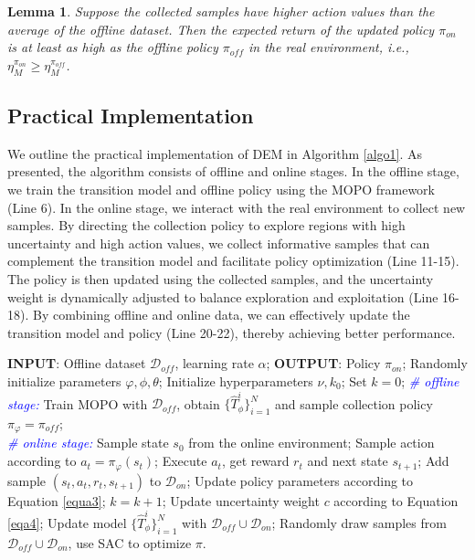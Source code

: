 \documentclass[conference]{IEEEtran}
\newtheorem{lemma}{Lemma}
\begin{document}
\begin{lemma}
Suppose the collected samples have higher action values than the average of the offline dataset. Then the expected return of the updated policy $\pi_{on}$ is at least as high as the offline policy $\pi_{off}$ in the real environment, i.e., $\eta_M^{\pi_{on}} \geq \eta_M^{\pi_{off}}$.
\end{lemma}

\subsection{Practical Implementation}
We outline the practical implementation of DEM in Algorithm \ref{algo1}. As presented, the algorithm consists of offline and online stages. In the offline stage, we train the transition model and offline policy using the MOPO framework (Line 6). In the online stage, we interact with the real environment to collect new samples. By directing the collection policy to explore regions with high uncertainty and high action values, we collect informative samples that can complement the transition model and facilitate policy optimization (Line 11-15). The policy is then updated using the collected samples, and the uncertainty weight is dynamically adjusted to balance exploration and exploitation (Line 16-18). By combining offline and online data, we can effectively update the transition model and policy (Line 20-22), thereby achieving better performance.

\begin{algorithm}[!tb]
\caption{Offline-to-Online Reinforcement Learning with Directed Exploration Models(DEM)}
\begin{algorithmic}[1]
  \STATE \textbf{INPUT}: Offline dataset $\mathcal{D}_{off}$, learning rate $\alpha$;
    \STATE \textbf{OUTPUT}: Policy $\pi_{on}$;
    \STATE Randomly initialize parameters $\varphi, \phi, \theta$;
    \STATE Initialize hyperparameters $\nu, k_0$; Set $k=0$;
    \STATE \textcolor{blue}{\textit{\# offline stage:}}
    \STATE Train MOPO with $\mathcal{D}_{off}$, obtain $\{\hat{T}_\phi^i\}_{i=1}^N$ and sample collection policy $\pi_{\varphi} = \pi_{off}$; \\
    \STATE \textcolor{blue}{\textit{\# online stage:}}
            \STATE Sample state $s_0$ from the online environment;
              \STATE Sample action according to $a_t = \pi_{\varphi}(s_t)$;
              \STATE Execute $a_t$, get reward $r_t$ and next state $s_{t+1}$;
              \STATE Add sample $(s_t, a_t, r_t, s_{t+1})$ to $\mathcal{D}_{on}$;
            \ENDFOR
            \STATE Update policy parameters according to Equation \ref{equa3};
            \STATE $k=k+1$;
            \STATE Update uncertainty weight $c$ according to Equation \ref{eqa4};
        \ENDFOR
        \STATE Update model $\{\hat{T}_\phi^i\}_{i=1}^N$ with $\mathcal{D}_{off} \cup \mathcal{D}_{on}$;
    \ENDFOR
    \STATE Randomly draw samples from $\mathcal{D}_{off} \cup \mathcal{D}_{on}$, use SAC to optimize $\pi$.
    \end{algorithmic}
    \label{algo1}
\end{algorithm}
\end{document}
